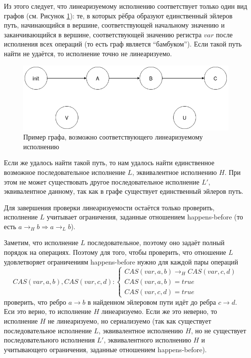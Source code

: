 \documentclass[times,specification,annotation]{itmo-student-thesis}
\begin{document}
Из этого следует, что линеаризуемому исполнению соответствует только один вид графов (см. Рисунок \ref{correct-graph-pic}): те, в которых рёбра образуют единственный эйлеров путь, начинающийся в вершине, соответствующей начальному значению и заканчивающийся в вершине, соответствующей значению регистра $var$ после исполнения всех операций (то есть граф является ``бамбуком''). Если такой путь найти не удаётся, то исполнение точно не линеаризуемо.

\begin{figure}[H]
  \centering
  \caption{Пример графа, возможно соответствующего линеаризуемому исполнению}
  \label{correct-graph-pic}
  \includegraphics[width=\linewidth]{correct_graph.png}
\end{figure}

Если же удалось найти такой путь, то нам удалось найти единственное возможное последовательное исполнение $L$, эквивалентное исполнению $H$. При этом не может существовать другое последовательное исполнение $L'$, эквивалентное данному, так как в графе существует единственный эйлеров путь.

Для завершения проверки линеаризуемости остаётся только проверить, исполнение $L$ учитывает ограничения, заданные отношением happens-before (то есть $a \rightarrow_H b \Rightarrow a \rightarrow_L b$). 

Заметим, что исполнение $L$ последовательное, поэтому оно задаёт полный порядок на операциях. Поэтому для того, чтобы проверить, что отношение $L$ удовлетворяет ограничениям happens-before нужно для каждой пары операций \begin{equation*}
CAS(var, a, b), CAS(var, c, d):
 \begin{cases}
   CAS(var, a, b) \rightarrow_H CAS(var, c, d)\\
   CAS(var, a, b) = true \\
   CAS(var, c, d) = true
 \end{cases}
\end{equation*} проверить, что ребро $a \rightarrow b$ в найденном эйлеровом пути идёт до ребра $c \rightarrow d$.  Еси это верно, то исполнение $H$ линеаризуемо. Если же это неверно, то исполнение $H$ не линеаризуемо, но сериализуемо (так как существует последовательное исполнение $L$, эквивалентное исполнению $H$, но не существует последовательного исполнения $L'$, эквивалентного исполнению $H$ и учитывающего ограничения, заданные отношением happens-before).
\end{document}
